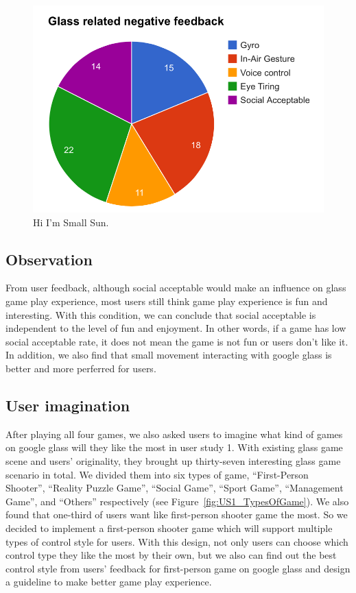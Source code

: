 \begin{figure}[!t]
\centering
\includegraphics[width=0.9\columnwidth]{Figures/US1_userfeedbackStatistics.png}
\caption{Hi I'm Small Sun.}
\label{fig:PS_Frus}
\end{figure}


\subsection{Observation}
From user feedback, although social acceptable would make an influence on glass game play experience, most users still think game play experience is fun and interesting. With this condition, we can conclude that social acceptable is independent to the level of fun and enjoyment. In other words, if a game has low social acceptable rate, it does not mean the game is not fun or users don't like it. In addition, we also find that small movement interacting with google glass is better and more perferred for users. 


\subsection{User imagination}
After playing all four games, we also asked users to imagine what kind of games on google glass will they like the most in user study 1. With existing glass game scene and users' originality, they brought up thirty-seven interesting glass game scenario in total. We divided them into six types of game, ``First-Person Shooter'', ``Reality Puzzle Game'', ``Social Game'', ``Sport Game'', ``Management Game'', and ``Others'' respectively (see Figure~\ref{fig:US1_TypesOfGame}). We also found that one-third of users want like first-person shooter game the most. So we decided to implement a first-person shooter game which will support multiple types of control style for users. With this design, not only users can choose which control type they like the most by their own, but we also can find out the best control style from users' feedback for first-person game on google glass and design a guideline to make better game play experience.

